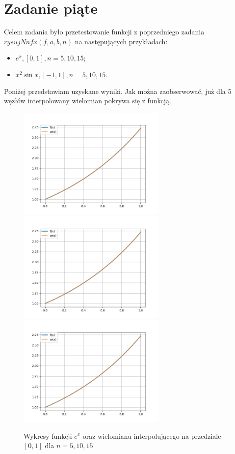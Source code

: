 \documentclass{article}
\begin{document}
\section{Zadanie piąte}
Celem zadania było przetestowanie funkcji z poprzedniego 
zadania $rysujNnfx(f,a,b,n)$ na następujących 
przykładach:

\begin{itemize}
    \item $e^x, [0,1], n=5,10,15$;
    \item $x^2\sin x, [-1,1], n=5,10,15$.
\end{itemize}
\quad\newline
Poniżej przedstawiam uzyskane wyniki. Jak można 
zaobserwować, już dla 5 węzłów interpolowany 
wielomian pokrywa się z funkcją.

\begin{figure}[H]
    \centering
    \includegraphics[width=0.65\textwidth]{plots/5a_5.png}
    \includegraphics[width=0.65\textwidth]{plots/5a_10.png}
    \includegraphics[width=0.65\textwidth]{plots/5a_15.png}
    \caption{Wykresy funkcji $e^x$ oraz wielomianu interpolującego na przedziale 
    $[0,1]$ dla $n=5,10,15$}
\end{figure}
\end{document}
